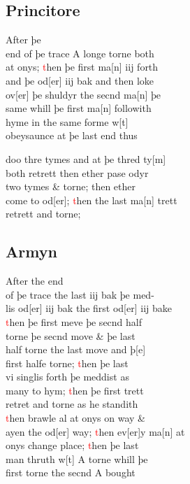 \documentclass[12pt,letter]{article} %
\newcommand{\red}[1]{\textcolor{red}{#1}}
\newcommand{\srcpg}[1]{
    \noindent{
        \color{Gray}{\rule[0.5ex]{\linewidth}{1pt}~#1} 
    
    }
}
\begin{document}
\subsection{Princitore}
After þe\\
end of þe trace A longe torne both\\
at onys; \red{t}hen þe first ma{[}n{]} iij forth\\
and þe od{[}er{]} iij bak and then loke\\
ov{[}er{]} þe shuldyr the secnd ma{[}n{]} þe\\
same whill þe first ma{[}n{]} followith\\
hyme in the same forme w{[}t{]}\\
obeysaunce at þe last end thus \srcpg{61}
doo thre tymes and at þe thred ty{[}m{]}\\
both retrett then ether pase odyr\\
two tymes \& torne; then ether\\
come to od{[}er{]}; \red{t}hen the last ma{[}n{]} trett\\
retrett and torne;

\subsection{Armyn}
After the end\\
of þe trace the last iij bak þe med-\\
lis od{[}er{]} iij bak the first od{[}er{]} iij bake\\
\red{t}hen þe first meve þe secnd half\\
torne þe secnd move \& þe last\\
half torne the last move and þ{[}e{]}\\
first halfe torne; \red{t}hen þe last\\
vi singlis forth þe meddist as\\
many to hym; \red{t}hen þe first trett\\
retret and torne as he standith\\
\red{t}hen brawle al at onys on way \&\\
ayen the od{[}er{]} way; \red{t}hen ev{[}er{]}y ma{[}n{]} at\\
onys change place; \red{t}hen þe last\\
man thruth w{[}t{]} A torne whill þe\\
first torne the secnd A bought
\end{document}
